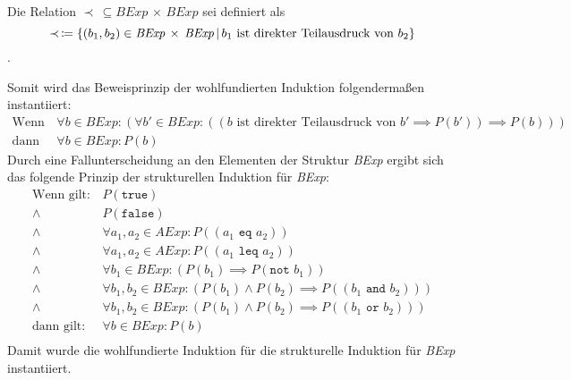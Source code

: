 																	Die Relation $ \prec \,\subseteq \textit{BExp} \,\times\, \textit{BExp} $ sei definiert als \[ \prec \,\coloneqq \{ (b _ 1, b _ 2) \in \textit{BExp} \,\times\, \textit{BExp} \,\vert\, b _ 1 \text{ ist direkter Teilausdruck von } b _ 2 \} \].

																	Somit wird das Beweisprinzip der wohlfundierten Induktion folgendermaßen instantiiert:
																	\begin{align*}
																		\text{Wenn gilt:} & \,\forall b \in \textit{BExp} : (\forall b' \in \textit{BExp} : ((b \text{ ist direkter Teilausdruck von } b' \implies P(b')) \implies P(b))) \\
																		\text{dann gilt:} & \,\forall b \in \textit{BExp} : P(b)
																	\end{align*}
																	Durch eine Fallunterscheidung an den Elementen der Struktur \textit{BExp} ergibt sich das folgende Prinzip der strukturellen Induktion für \textit{BExp}:
																	\begin{align*}
																		\text{Wenn gilt:} & \,P(\texttt{true})                                                                                            \\
																		\land             & \,P(\texttt{false})                                                                                           \\
																		\land             & \,\forall a _ 1, a _ 2 \in \textit{AExp} : P((a _ 1 \texttt{ eq } a _ 2))                                     \\
																		\land             & \,\forall a _ 1, a _ 2 \in \textit{AExp} : P((a _ 1 \texttt{ leq } a _ 2))                                    \\
																		\land             & \,\forall b _ 1 \in \textit{BExp} : (P(b _ 1) \implies P(\texttt{not } b _ 1))                                \\
																		\land             & \,\forall b _ 1, b _ 2 \in \textit{BExp} : (P(b _ 1) \land P(b _ 2) \implies P((b _ 1 \texttt{ and } b _ 2))) \\
																		\land             & \,\forall b _ 1, b _ 2 \in \textit{BExp} : (P(b _ 1) \land P(b _ 2) \implies P((b _ 1 \texttt{ or } b _ 2)))  \\
																		\text{dann gilt:} & \,\forall b \in \textit{BExp} : P(b)                                                                          \\
																	\end{align*}
																	Damit wurde die wohlfundierte Induktion für die strukturelle Induktion für \textit{BExp} instantiiert.

